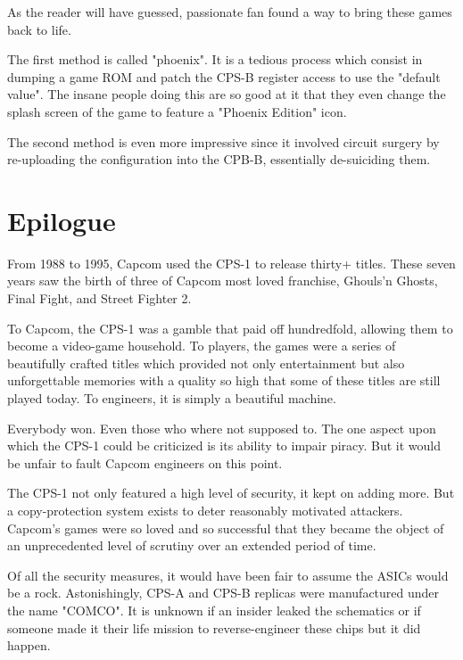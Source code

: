 As the reader will have guessed, passionate fan found a way to bring these games back to life.

The first method is called "phoenix". It is a tedious process which consist in dumping a game ROM and patch the CPS-B register access to use the "default value"\cite{csp1_phoenix}. The insane people doing this are so good at it that they even change the splash screen of the game to feature a "Phoenix Edition" icon.

The second method is even more impressive since it involved circuit surgery by re-uploading the configuration into the CPB-B, essentially de-suiciding them\cite{arcadeHackerCPS1Desuicide}.






\section{Epilogue}
From 1988 to 1995, Capcom used the CPS-1 to release thirty+ titles. These seven years saw the birth of three of Capcom most loved franchise, Ghouls’n Ghosts, Final Fight, and Street Fighter 2.

To Capcom, the CPS-1 was a gamble that paid off hundredfold, allowing them to become a video-game household. To players, the games were a series of beautifully crafted titles which provided not only entertainment but also unforgettable memories with a quality so high that some of these titles are still played today. To engineers, it is simply a beautiful machine.

Everybody won. Even those who where not supposed to. The one aspect upon which the CPS-1 could be criticized is its ability to impair piracy. But it would be unfair to fault Capcom engineers on this point.

 The CPS-1 not only featured a high level of security, it kept on adding more. But a copy-protection system exists to deter reasonably motivated attackers. Capcom's games were so loved and so successful that they became the object of an unprecedented level of scrutiny over an extended period of time.

Of all the security measures, it would have been fair to assume the ASICs would be a rock. Astonishingly, CPS-A and CPS-B replicas were manufactured under the name "COMCO"\cite{arcadeHackerCPS1}. It is unknown if an insider leaked the schematics or if someone made it their life mission to reverse-engineer these chips but it did happen.

